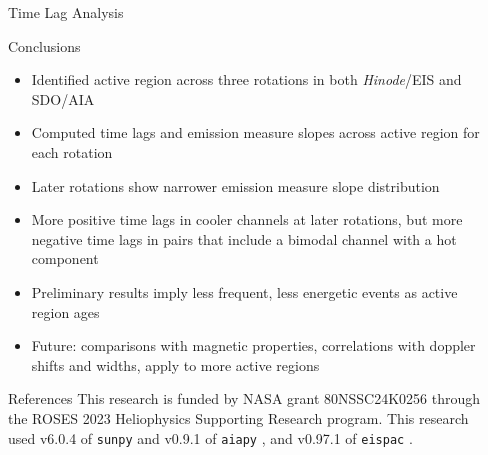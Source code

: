 \documentclass[final]{beamer}
\newlength{\sepwidth}
\newlength{\colwidth}
\newcommand{\separatorcolumn}{\begin{column}{\sepwidth}\end{column}}
\begin{document}
\begin{frame}[t]
\begin{columns}[t]
\begin{column}{\colwidth}
\begin{block}{Time Lag Analysis}
  \end{block}

  \vspace{-35pt}

  \begin{block}{Conclusions}

    \begin{itemize}
      \item Identified active region across \alert{three rotations} in both \textit{Hinode}/EIS and SDO/AIA
      \item Computed \alert{time lags} and \alert{emission measure slopes} across active region for each rotation
      \item Later rotations show \alert{narrower emission measure slope distribution}
      \item \alert{More positive time lags} in cooler channels at later rotations, but \alert{more negative time lags} in pairs that include a bimodal channel with a hot component
      \item Preliminary results imply \alert{less frequent, less energetic events as active region ages}
      \item \alert{Future:} comparisons with magnetic properties, correlations with doppler shifts and widths, apply to more active regions
    \end{itemize}

  \end{block}

  \vspace{-35pt}

  \begin{block}{References}
    \scriptsize
    This research is funded by NASA grant 80NSSC24K0256 through the ROSES 2023 Heliophysics Supporting Research program.
    This research used v6.0.4 of \texttt{sunpy} \citep{the_sunpy_community_sunpy_2020} and v0.9.1 of \texttt{aiapy} \citep{barnes_aiapy_2020}, and v0.97.1 of \texttt{eispac} \citep{weberg_eispac_2023}.
    \begin{multicols}{2}
      
      
    \end{multicols}
  \end{block}

\end{column}

\separatorcolumn
\end{columns}
\end{frame}
\end{document}
